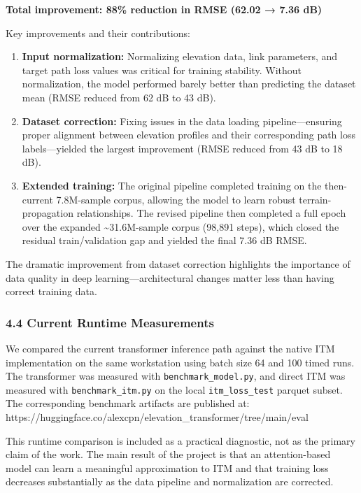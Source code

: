\documentclass[
]{article}
\begin{document}
\textbf{Total improvement: 88\% reduction in RMSE (62.02 → 7.36 dB)}

Key improvements and their contributions:

\begin{enumerate}
\def\labelenumi{\arabic{enumi}.}
\item
  \textbf{Input normalization:} Normalizing elevation data, link
  parameters, and target path loss values was critical for training
  stability. Without normalization, the model performed barely better
  than predicting the dataset mean (RMSE reduced from 62 dB to 43 dB).
\item
  \textbf{Dataset correction:} Fixing issues in the data loading
  pipeline---ensuring proper alignment between elevation profiles and
  their corresponding path loss labels---yielded the largest improvement
  (RMSE reduced from 43 dB to 18 dB).
\item
  \textbf{Extended training:} The original pipeline completed training
  on the then-current 7.8M-sample corpus, allowing the model to learn
  robust terrain-propagation relationships. The revised pipeline then
  completed a full epoch over the expanded \textasciitilde31.6M-sample
  corpus (98,891 steps), which closed the residual train/validation gap
  and yielded the final 7.36 dB RMSE.
\end{enumerate}

The dramatic improvement from dataset correction highlights the
importance of data quality in deep learning---architectural changes
matter less than having correct training data.

\subsubsection{4.4 Current Runtime
Measurements}\label{current-runtime-measurements}

We compared the current transformer inference path against the native
ITM implementation on the same workstation using batch size 64 and 100
timed runs. The transformer was measured with
\texttt{benchmark\_model.py}, and direct ITM was measured with
\texttt{benchmark\_itm.py} on the local \texttt{itm\_loss\_test} parquet
subset. The corresponding benchmark artifacts are published at:
https://huggingface.co/alexcpn/elevation\_transformer/tree/main/eval

This runtime comparison is included as a practical diagnostic, not as
the primary claim of the work. The main result of the project is that an
attention-based model can learn a meaningful approximation to ITM and
that training loss decreases substantially as the data pipeline and
normalization are corrected.
\end{document}
